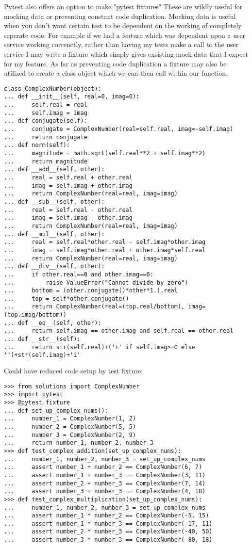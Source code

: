 Pytest also offers an option to make "pytest fixtures" These are wildly useful for mocking data or preventing constant code duplication.
Mocking data is useful when you don't want certain test to be dependent on the working of completely seperate code.
For example if we had a feature which was dependent upon a user service working correnctly, rather than having my tests make a call to the user service I may write a fixture which simply gives exsisting mock data that I expect for my feature.
As far as preventing code duplication a fixture may also be utilized to create a class object which we can then call within our function.

\begin{lstlisting}
class ComplexNumber(object):
... def __init__(self, real=0, imag=0):
...     self.real = real
...     self.imag = imag
... def conjugate(self):
...     conjugate = ComplexNumber(real=self.real, imag=-self.imag)
...     return conjugate
... def norm(self):
...     magnitude = math.sqrt(self.real**2 + self.imag**2)
...     return magnitude
... def __add__(self, other):
...     real = self.real + other.real
...     imag = self.imag + other.imag
...     return ComplexNumber(real=real, imag=imag)
... def __sub__(self, other):
...     real = self.real - other.real
...     imag = self.imag - other.imag
...     return ComplexNumber(real=real, imag=imag)
... def __mul__(self, other):
...     real = self.real*other.real - self.imag*other.imag
...     imag = self.imag*other.real + other.imag*self.real
...     return ComplexNumber(real=real, imag=imag)
... def __div__(self, other):
...     if other.real==0 and other.imag==0:
...         raise ValueError("Cannot divide by zero")
...     bottom = (other.conjugate()*other*1.).real
...     top = self*other.conjugate()
...     return ComplexNumber(real=(top.real/bottom), imag=(top.imag/bottom))
... def __eq__(self, other):
...     return self.imag == other.imag and self.real == other.real
... def __str__(self):
...     return str(self.real)+('+' if self.imag>=0 else '')+str(self.imag)+'i'
\end{lstlisting}
Could have reduced code setup by test fixture:
\begin{lstlisting}
>>> from solutions import ComplexNumber
>>> import pytest
>>> @pytest.fixture
... def set_up_complex_nums():
...     number_1 = ComplexNumber(1, 2)
...     number_2 = ComplexNumber(5, 5)
...     number_3 = ComplexNumber(2, 9)
...     return number_1, number_2, number_3
>>> def test_complex_addition(set_up_complex_nums):
...     number_1, number_2, number_3 = set_up_complex_nums
...     assert number_1 + number_2 == ComplexNumber(6, 7)
...     assert number_1 + number_3 == ComplexNumber(3, 11)
...     assert number_2 + number_3 == ComplexNumber(7, 14)
...     assert number_3 + number_3 == ComplexNumber(4, 18)
>>> def test_complex_multiplication(set_up_complex_nums):
...     number_1, number_2, number_3 = set_up_complex_nums
...     assert number_1 * number_2 == ComplexNumber(-5, 15)
...     assert number_1 * number_3 == ComplexNumber(-17, 11)
...     assert number_2 * number_3 == ComplexNumber(-40, 50)
...     assert number_3 * number_3 == ComplexNumber(-80, 18)
\end{lstlisting}

